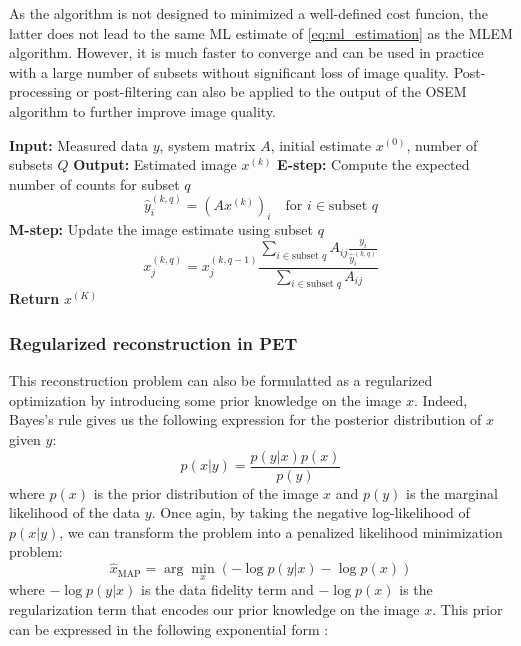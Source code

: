 As the algorithm is not designed to minimized a well-defined cost funcion, the latter does not lead to the
same ML estimate of \ref{eq:ml_estimation} as the MLEM algorithm. However, it is much faster to converge and can be used in practice with a large number of subsets without significant loss of image quality.
Post-processing or post-filtering can also be applied to the output of the OSEM algorithm to further improve image quality.

\begin{algorithm}
\caption{Ordered Subset Expectation Maximization (OSEM)}
\begin{algorithmic}[1]
\State \textbf{Input:} Measured data $y$, system matrix $A$, initial estimate $x^{(0)}$, number of subsets $Q$
\State \textbf{Output:} Estimated image $x^{(k)}$
        \State \textbf{E-step:} Compute the expected number of counts for subset $q$
        \begin{equation*}
            \hat{y}_{i}^{(k,q)} = (Ax^{(k)})_i \quad \text{for } i \in \text{subset } q
        \end{equation*}
        \State \textbf{M-step:} Update the image estimate using subset $q$
        \begin{equation*}
            x_j^{(k,q)} = x_j^{(k,q-1)} \frac{\sum_{i \in \text{subset } q} A_{ij} \frac
            {y_i}{\hat{y}_i^{(k,q)}}}{\sum_{i \in \text{subset } q} A_{ij}}
        \end{equation*}
    \EndFor
\EndFor
\State \textbf{Return} $x^{(K)}$
\end{algorithmic}
\label{alg:osem}
\end{algorithm}

\subsubsection{Regularized reconstruction in PET}

This reconstruction problem can also be formulatted as a regularized optimization by introducing some prior knowledge on the image $x$.
Indeed, Bayes's rule gives us the following expression for the posterior distribution of $x$ given $y$:
\begin{equation}
    p(x|y) = \frac{p(y|x) p(x)}{p(y)}
\end{equation}
where $p(x)$ is the prior distribution of the image $x$ and $p(y)$ is the marginal likelihood of the data $y$.
Once agin, by taking the negative log-likelihood of $p(x|y)$, we can transform the problem into a penalized likelihood minimization problem:
\begin{equation}
    \hat{x}_{\text{MAP}} = \arg \min_{x} \left( -\log p(y|x) - \log p(x) \right)
\end{equation}
where $-\log p(y|x)$ is the data fidelity term and $-\log p(x)$ is the regularization term that encodes our prior knowledge on the image $x$.
This prior can be expressed in the following exponential form :

